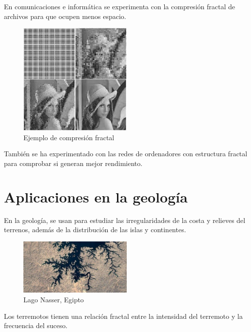 \noindent En comunicaciones e informática se experimenta con la compresión fractal de archivos para que ocupen menos espacio.\cite{compresion-fractal} \\

\begin{figure}[H]
    \centering
    \includegraphics[width=0.5\textwidth]{figures/fractal-compression.jpeg}
    \caption{Ejemplo de compresión fractal}
    \label{fig:fractal-compression}
\end{figure}

\noindent También se ha experimentado con las redes de ordenadores con estructura fractal para comprobar si generan mejor rendimiento. \cite{fractales-img}

\section{Aplicaciones en la geología}

\noindent En la geología, se usan para estudiar las irregularidades de la costa y relieves del terrenos, además de la distribución de las islas y continentes.\cite{BBVA-2020}\\

\begin{figure}[H]
    \centering
    \includegraphics[width=0.5\textwidth]{figures/Lake-Nasser.jpeg}
    \caption{Lago Nasser, Egipto}
    \label{fig:lake-nasser}
\end{figure}

\noindent Los terremotos tienen una relación fractal entre la intensidad del terremoto y la frecuencia del suceso. \cite{geologia}\\

